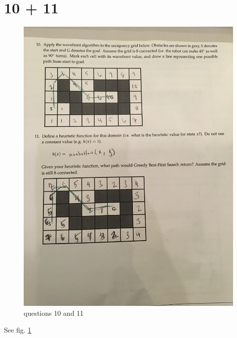 \section{10  + 11}
\begin{figure}[htbp]
   \centering
   \includegraphics[width=\textwidth, angle=-90]{figs/1011.jpg} %
   \caption{questions 10 and 11}
   \label{fig:1011}
\end{figure}
See fig. \ref{fig:1011}
